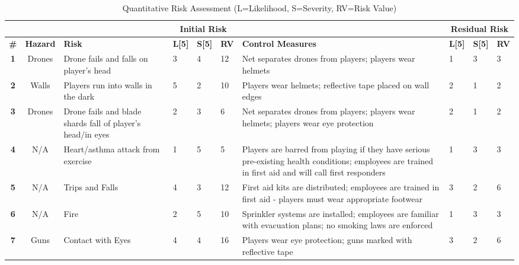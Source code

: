 \documentclass{report_template_oxford}
\begin{document}
\begin{table}[h]
\centering
\caption{Quantitative Risk Assessment (L=Likelihood, S=Severity, RV=Risk Value)}
\begin{tabular}{|c|c|p{4cm}|p{0.5cm}|p{0.5cm}|p{0.6cm}|p{5cm}|p{0.55cm}|p{0.55cm}|p{0.6cm}|}
\hline
\multicolumn{3}{|c|}{\cellcolor{gray! 30}} &
\multicolumn{3}{c|}{\cellcolor{gray! 30}\textbf{Initial Risk}}&
\multicolumn{1}{c|}{\cellcolor{gray! 30}} &
\multicolumn{3}{c|}{\cellcolor{gray! 30}\textbf{Residual Risk}}\\
\hline
\cellcolor{gray! 30}\textbf{\#}&\cellcolor{gray! 30}\textbf{Hazard}&\cellcolor{gray! 30}\textbf{Risk}&\cellcolor{gray! 30}\textbf{L[5]}&\cellcolor{gray! 30}\textbf{S[5]}&\cellcolor{gray! 30}\textbf{RV}&\cellcolor{gray! 30}\textbf{Control Measures}&\cellcolor{gray! 30}\textbf{L[5]}&\cellcolor{gray! 30}\textbf{S[5]}&\cellcolor{gray! 30}\textbf{RV}\\
\hline
\cellcolor{gray! 30}\textbf{1}&Drones&Drone fails and falls on player’s head&3&4&\cellcolor{orange! 90}12&Net separates drones from players; players wear helmets&1&3&\cellcolor{green! 100}3\\
\hline
\cellcolor{gray! 30}\textbf{2}&Walls&Players run into walls in the dark&5&2&\cellcolor{orange! 90} 10&Players wear helmets; reflective tape placed on wall edges&2&1&\cellcolor{green! 100} 2\\
\hline
\cellcolor{gray! 30}\textbf{3}&Drones&Drone fails and blade shards fall of player’s head/in eyes&2&3&\cellcolor{yellow! 100}6&Net separates drones from players; players wear helmets; players wear eye protection&2&1&\cellcolor{green! 90}2\\
\hline
\cellcolor{gray! 30}\textbf{4}&N/A&Heart/asthma attack from exercise&1&5&\cellcolor{yellow! 100}5&Players are barred from playing if they have serious pre-existing health conditions; employees are trained in first aid and will call first responders&1&3&\cellcolor{green! 100}3\\
\hline
\cellcolor{gray! 30}\textbf{5}&N/A&Trips and Falls&4&3&\cellcolor{orange! 90}12&First aid kits are distributed; employees are trained in first aid - players must wear appropriate footwear&3&2&\cellcolor{yellow! 100}6\\
\hline
\cellcolor{gray! 30}\textbf{6}&N/A&Fire&2&5&\cellcolor{orange! 90}10&Sprinkler systems are installed; employees are familiar with evacuation plans; no smoking laws are enforced&1&3&\cellcolor{green! 100}3\\
\hline
\cellcolor{gray! 30}\textbf{7}&Guns&Contact with Eyes&4&4&\cellcolor{red! 85}16&Players wear eye protection; guns marked with reflective tape&3&2&\cellcolor{yellow! 100}6\\

\end{tabular}
\end{table}
\end{document}
